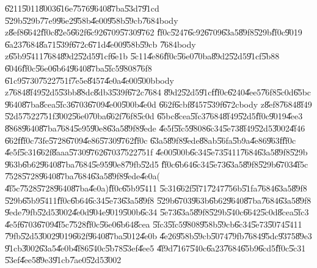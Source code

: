 \U{6211}\U{5011}\U{8003}\U{616e}\U{7576}\U{9640}\U{87ba}\U{53d7}\U{91cd}%
\U{529b}\U{529b}\U{77e9}\U{96e2}\U{958b}\U{4e00}\U{958b}\U{59cb}\U{7684}body
z\U{8ef8}\U{6642}\U{ff0c}\U{82e5}\U{662f}\U{6c92}\U{6709}\U{5730}\U{9762}%
\U{ff0c}\U{5247}\U{6c92}\U{6709}\U{63a5}\U{89f8}\U{529b}\U{ff0c}\U{9019}%
\U{6a23}\U{7684}\U{8a71}\U{539f}\U{672c}\U{671d}\U{4e00}\U{958b}\U{59cb}%
\U{7684}body z\U{65b9}\U{5411}\U{7684}\U{89d2}\U{52d5}\U{91cf}\U{6e1b}%
\U{5c11}\U{4e86}\U{ff0c}\U{56e0}\U{70ba}\U{89d2}\U{52d5}\U{91cf}\U{5b88}%
\U{6046}\U{ff0c}\U{56e0}\U{6b64}\U{9640}\U{87ba}\U{5fc5}\U{9808}\U{76f8}%
\U{61c9}\U{5730}\U{7522}\U{751f}\U{7e5e}\U{8457}\U{4e0a}\U{4e00}\U{500b}body
z\U{7684}\U{8f49}\U{52d5}\U{53bb}\U{88dc}\U{8db3}\U{539f}\U{672c}\U{7684}%
\U{89d2}\U{52d5}\U{91cf}\U{ff0c}\U{6240}\U{4ee5}\U{76f8}\U{5c0d}\U{65bc}%
\U{9640}\U{87ba}\U{8cea}\U{5fc3}\U{6703}\U{6709}\U{4e00}\U{500b}\U{4e0d}%
\U{662f}\U{6cbf}\U{8457}\U{539f}\U{672c}body z\U{8ef8}\U{7684}\U{8f49}%
\U{52d5}\U{7522}\U{751f}\U{3002}\U{56e0}\U{70ba}\U{662f}\U{76f8}\U{5c0d}%
\U{65bc}\U{8cea}\U{5fc3}\U{7684}\U{8f49}\U{52d5}\U{ff0c}\U{9019}\U{4ee3}%
\U{8868}\U{9640}\U{87ba}\U{7684}\U{5e95}\U{90e8}\U{63a5}\U{89f8}\U{9ede}%
\U{4e5f}\U{5fc5}\U{9808}\U{6c34}\U{5e73}\U{8f49}\U{52d5}\U{3002}\U{4f46}%
\U{662f}\U{ff0c}\U{73fe}\U{5728}\U{6709}\U{4e86}\U{5730}\U{9762}\U{ff0c}%
\U{63a5}\U{89f8}\U{9ede}\U{88ab}\U{56fa}\U{5b9a}\U{4e86}\U{963f}\U{ff0c}%
\U{4e5f}\U{5c31}\U{662f}\U{8aaa}\U{5730}\U{9762}\U{6703}\U{7522}\U{751f}%
\U{4e00}\U{500b}\U{6c34}\U{5e73}\U{5411}\U{7684}\U{63a5}\U{89f8}\U{529b}%
\U{963b}\U{6b62}\U{9640}\U{87ba}\U{7684}\U{5e95}\U{90e8}\U{79fb}\U{52d5}%
\U{ff0c}\U{6b64}\U{6c34}\U{5e73}\U{63a5}\U{89f8}\U{529b}\U{6703}\U{4f5c}%
\U{7528}\U{5728}\U{9640}\U{87ba}\U{7684}\U{63a5}\U{89f8}\U{9ede}\U{4e0a}(%
\U{4f5c}\U{7528}\U{5728}\U{9640}\U{87ba}\U{4e0a})\U{ff0c}\U{65b9}\U{5411}%
\U{5c31}\U{662f}\U{5f71}\U{7247}\U{756b}\U{51fa}\U{7684}\U{63a5}\U{89f8}%
\U{529b}\U{65b9}\U{5411}\U{ff0c}\U{6b64}\U{6c34}\U{5e73}\U{63a5}\U{89f8}%
\U{529b}\U{6703}\U{963b}\U{6b62}\U{9640}\U{87ba}\U{7684}\U{63a5}\U{89f8}%
\U{9ede}\U{79fb}\U{52d5}\U{3002}\U{4e0d}\U{904e}\U{9019}\U{500b}\U{6c34}%
\U{5e73}\U{63a5}\U{89f8}\U{529b}\U{540c}\U{6642}\U{5c0d}\U{8cea}\U{5fc3}%
\U{4e5f}\U{6703}\U{6709}\U{4f5c}\U{7528}\U{ff0c}\U{56e0}\U{6b64}\U{8cea}%
\U{5fc3}\U{5fc5}\U{9808}\U{958b}\U{59cb}\U{6c34}\U{5e73}\U{5074}\U{5411}%
\U{79fb}\U{52d5}\U{3002}\U{9019}\U{662f}\U{9640}\U{87ba}\U{5012}\U{4e0b}%
\U{4e26}\U{958b}\U{59cb}\U{5074}\U{79fb}\U{7684}\U{95dc}\U{9375}\U{89e3}%
\U{91cb}\U{3002}\U{63a5}\U{4e0b}\U{4f86}\U{540c}\U{5b78}\U{53ef}\U{4ee5}%
\U{4f9d}\U{7167}\U{540c}\U{6a23}\U{7684}\U{65b9}\U{6cd5}\U{ff0c}\U{5c31}%
\U{53ef}\U{4ee5}\U{89e3}\U{91cb}\U{7ae0}\U{52d5}\U{3002}

